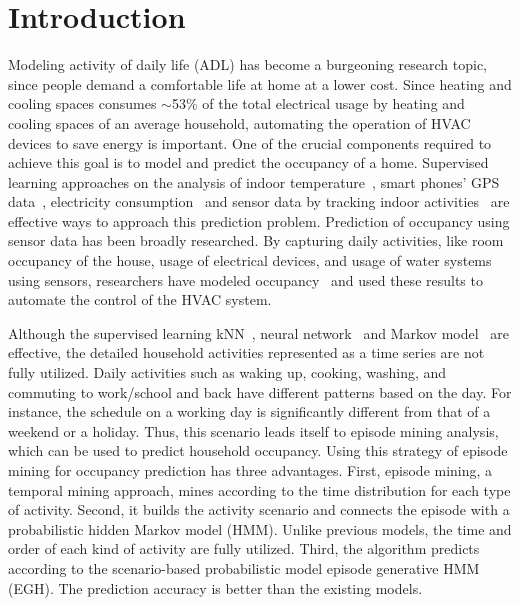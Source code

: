 \section{Introduction}

Modeling activity of daily life (ADL) has become a burgeoning research topic, 
since people demand a comfortable life at home
at a lower cost. 
Since heating and cooling spaces consumes $\sim$53\% of the total electrical usage 
by heating and cooling spaces %
of an average household, 
automating the operation of HVAC devices to save energy is important. 
One of the crucial components required to achieve this goal is 
to model and predict the occupancy of a home. 
Supervised learning approaches on the analysis of indoor temperature~\cite{kleiminger2014predicting}, 
smart phones' GPS data~\cite{koehler2013therml}, 
electricity consumption~\cite{erickson2010occupancy} and 
sensor data by tracking indoor activities~\cite{scott2011preheat,alrazgan2011learning} 
are effective ways to approach this prediction problem. 
Prediction of occupancy using sensor data has been broadly researched. 
By capturing daily activities, like room occupancy of the house, 
usage of electrical devices, 
and usage of water systems using sensors, 
researchers have modeled occupancy~\cite{mahmoud2013behavioural,erickson2010occupancy,beltran2014optimal} 
and used these results to automate the control of the HVAC system. 

Although the supervised learning kNN~\cite{scott2011preheat}, 
neural network~\cite{mahmoud2013behavioural} and Markov model~\cite{erickson2010occupancy} 
are effective, 
the detailed household activities represented as a time series are not fully utilized. 
Daily activities such as waking up, cooking, washing, and commuting to work/school and back 
have different patterns based on the day. 
For instance, the schedule on a working day is significantly different from that of a weekend 
or a holiday. 
Thus, this scenario leads itself to episode mining analysis, 
which can be used to predict household occupancy. 
Using this strategy of episode mining for occupancy prediction has three advantages. 
First, episode mining, a temporal mining approach, mines according to the time 
distribution for each type of activity. 
Second, it builds the activity scenario and connects the episode with 
a probabilistic hidden Markov model (HMM). 
Unlike previous models, 
the time and order of each kind of activity are fully utilized. 
Third, the algorithm predicts according to the scenario-based probabilistic model episode 
generative HMM (EGH). The prediction accuracy is better than the existing models. 

